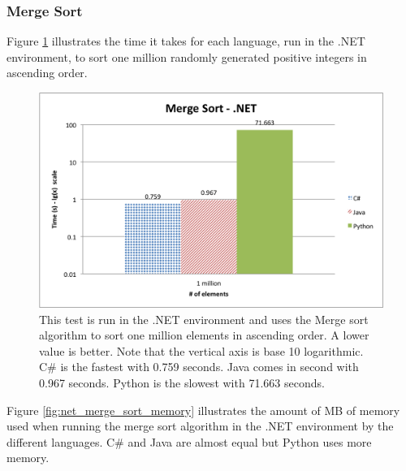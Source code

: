 \subsubsection{Merge Sort}

Figure \ref{fig:net_merge_sort} illustrates the time it takes for each language, run in the .NET environment, to sort one million randomly generated positive integers in ascending order.

\begin{figure}[h]
	\centering
	\includegraphics[width=1.0\linewidth]{chapters/new_media/MergeSortNet.png}
	\caption{This test is run in the .NET environment and uses the Merge sort algorithm to sort one million elements in ascending order. A lower value is better. Note that the vertical axis is base 10 logarithmic. C\# is the fastest with 0.759 seconds. Java comes in second with 0.967 seconds. Python is the slowest with 71.663 seconds.}
	\label{fig:net_merge_sort}
\end{figure}

Figure \ref{fig:net_merge_sort_memory} illustrates the amount of MB of memory used when running the merge sort algorithm in the .NET environment by the different languages. C\# and Java are almost equal but Python uses more memory.

